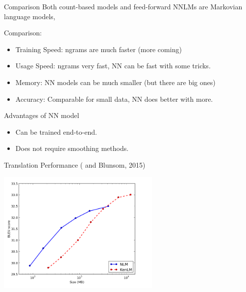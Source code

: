 \documentclass{beamer}
\begin{document}
\begin{frame}{Comparison}
  Both count-based models and feed-forward NNLMs are Markovian language models, 

  Comparison:
  \begin{itemize}
  \item Training Speed: ngrams are much faster (more coming)
  \item Usage Speed: ngrams very fast, NN can be fast with some tricks. 
  \item Memory: NN models can be much smaller (but there are big ones)
  \item Accuracy: Comparable for small data, NN does better with more.
  \end{itemize}
  
  Advantages of NN model
  \begin{itemize}
  \item Can be trained end-to-end.
    \air 
  \item Does not require smoothing methods.
  \end{itemize}


\end{frame}

\begin{frame}{Translation Performance ( and Blunsom, 2015)}
  \begin{center}
    \includegraphics[width=8cm]{blunsomgraph}
  \end{center}
\end{frame}
\end{document}
